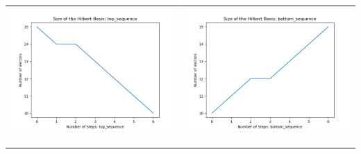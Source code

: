 \documentclass[10pt]{article}
\begin{document}
\begin{tabular}{c|c}
\begin{minipage}{.4\textwidth}
\includegraphics[width=\textwidth]{"DATA/5d/6 generators 1 bound I/top_sequence SIZE"}
\end{minipage} &
\begin{minipage}{.4\textwidth}
\includegraphics[width=\textwidth]{"DATA/5d/6 generators 1 bound I bottomup/bottom_sequence SIZE"}
\end{minipage} \\ \\
\hline \\\begin{minipage}{.4\textwidth}

\end{minipage}
\end{tabular}
\end{document}

